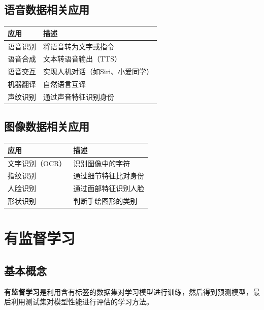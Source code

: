 \subsection{语音数据相关应用}

\begin{table}[htbp]
\centering\small
\begin{tabular}{ll}
\toprule
\textbf{应用} & \textbf{描述} \\
\midrule
语音识别 & 将语音转为文字或指令 \\
语音合成 & 文本转语音输出（TTS） \\
语音交互 & 实现人机对话（如Siri、小爱同学） \\
机器翻译 & 自然语言互译 \\
声纹识别 & 通过声音特征识别身份 \\
\bottomrule
\end{tabular}
\end{table}

\subsection{图像数据相关应用}

\begin{table}[htbp]
\centering\small
\begin{tabular}{ll}
\toprule
\textbf{应用} & \textbf{描述} \\
\midrule
文字识别（OCR） & 识别图像中的字符 \\
指纹识别 & 通过细节特征比对身份 \\
人脸识别 & 通过面部特征识别人脸 \\
形状识别 & 判断手绘图形的类别 \\
\bottomrule
\end{tabular}
\end{table}

\section{有监督学习}

\subsection{基本概念}

\begin{conceptbox}
\textbf{有监督学习}是利用含有标签的数据集对学习模型进行训练，然后得到预测模型，最后利用测试集对模型性能进行评估的学习方法。
\end{conceptbox}

